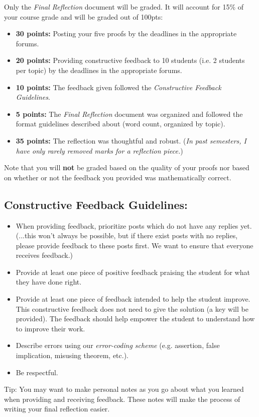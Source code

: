 Only the \emph{Final Reflection} document will be graded. It will account for 15$\%$ of your course grade and will be graded out of 100pts:

\begin{itemize}

\item \textbf{30 points:} Posting your five proofs by the deadlines in the appropriate forums.

\item \textbf{20 points:} Providing constructive feedback to 10 students (i.e. 2 students per topic) by the deadlines in the appropriate forums. 

\item \textbf{10 points:} The feedback given followed the \emph{Constructive Feedback Guidelines}. 

\item \textbf{5 points:} The \emph{Final Reflection} document was organized and followed the format guidelines described about (word count, organized by topic). 

\item \textbf{35 points:} The reflection was thoughtful and robust. (\emph{In past semesters, I have only rarely removed marks for a reflection piece.})

\end{itemize}

Note that you will \textbf{not} be graded based on the quality of your proofs nor based on whether or not the feedback you provided was mathematically correct.


\subsection*{Constructive Feedback Guidelines:}

\begin{itemize}

\item When providing feedback, prioritize posts which do not have any replies yet. (...this won't always be possible, but if there exist posts with no replies, please provide feedback to these posts first. We want to ensure that everyone receives feedback.) 

\item Provide at least one piece of positive feedback praising the student for what they have done right. 

\item Provide at least one piece of feedback intended to help the student improve. This constructive feedback does not need to give the solution (a key will be provided). The feedback should help empower the student to understand how to improve their work. 

\item Describe errors using our \emph{error-coding scheme} (e.g. assertion, false implication, misusing theorem, etc.). 

\item Be respectful. 

\end{itemize}

\noindent Tip: You may want to make personal notes as you go about what you learned when providing and receiving feedback. These notes will make the process of writing your final reflection easier.



